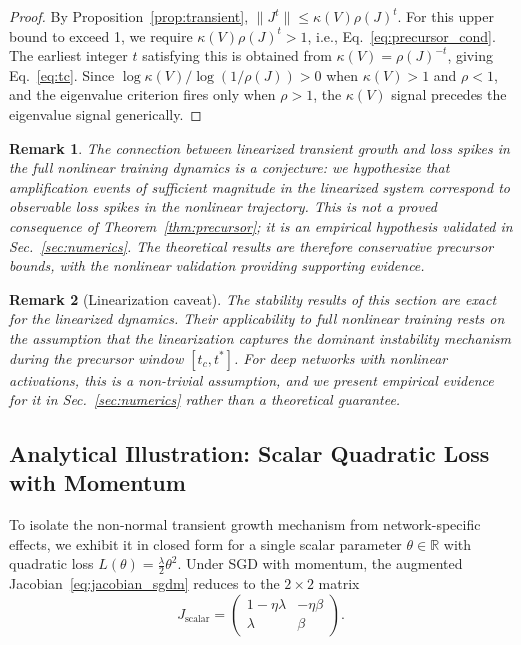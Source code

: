\documentclass[aps,prresearch,twocolumn,superscriptaddress,longbibliography]{revtex4-2}
\newtheorem*{remark}{Remark}
\newcommand{\R}{\mathbb{R}}
\begin{document}
\begin{proof}
By Proposition~\ref{prop:transient},
$\|J^t\|\leq\kappa(V)\rho(J)^t$.
For this upper bound to exceed 1, we require
$\kappa(V)\rho(J)^t > 1$, i.e., Eq.~\eqref{eq:precursor_cond}.
The earliest integer $t$ satisfying this is obtained from
$\kappa(V) = \rho(J)^{-t}$, giving Eq.~\eqref{eq:tc}.
Since $\log\kappa(V)/\log(1/\rho(J)) > 0$ when $\kappa(V)>1$ and
$\rho<1$, and the eigenvalue criterion fires only when $\rho>1$, the
$\kappa(V)$ signal precedes the eigenvalue signal generically.
\end{proof}

\begin{remark}
The connection between linearized transient growth and loss spikes in
the full nonlinear training dynamics is a conjecture: we hypothesize
that amplification events of sufficient magnitude in the linearized
system correspond to observable loss spikes in the nonlinear trajectory.
This is not a proved consequence of Theorem~\ref{thm:precursor}; it is an
empirical hypothesis validated in Sec.~\ref{sec:numerics}.
The theoretical results are therefore conservative precursor bounds, with
the nonlinear validation providing supporting evidence.
\end{remark}

\begin{remark}[Linearization caveat]
The stability results of this section are exact for the linearized
dynamics.
Their applicability to full nonlinear training rests on the assumption
that the linearization captures the dominant instability mechanism during
the precursor window $[t_c, t^*]$.
For deep networks with nonlinear activations, this is a non-trivial
assumption, and we present empirical evidence for it in Sec.~\ref{sec:numerics}
rather than a theoretical guarantee.
\end{remark}

\subsection{Analytical Illustration: Scalar Quadratic Loss with Momentum}
\label{subsec:toy}

To isolate the non-normal transient growth mechanism from
network-specific effects, we exhibit it in closed form for a single
scalar parameter $\theta\in\R$ with quadratic loss
$L(\theta) = \frac{\lambda}{2}\theta^2$.
Under SGD with momentum, the augmented Jacobian~\eqref{eq:jacobian_sgdm}
reduces to the $2\times 2$ matrix
\begin{equation}
J_{\mathrm{scalar}} =
\begin{pmatrix} 1-\eta\lambda & -\eta\beta \\ \lambda & \beta \end{pmatrix}.
\label{eq:scalar_jac}
\end{equation}
\end{document}
